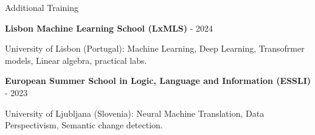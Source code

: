 \begin{rubric}{Additional Training}
\entry*%


    \textbf{Lisbon Machine Learning School (LxMLS)} - 2024\par 
    University of Lisbon (Portugal): Machine Learning, Deep Learning, Transofrmer models, Linear algebra, practical labs.\par
    
    

    


\entry*%
    \textbf{European Summer School in Logic, Language and Information (ESSLI)} - 2023 \par
    University of Ljubljana (Slovenia): Neural Machine Translation, Data Perspectivism, Semantic change detection.    \par
\end{rubric}
